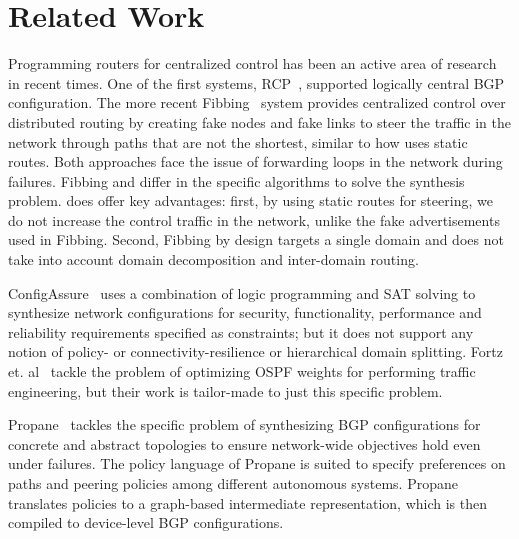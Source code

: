 \section{Related Work}\label{sec:related}
 Programming routers for centralized
control has been an active area of research in recent times. One of
the first systems, RCP~\cite{rcp}, supported logically central BGP
configuration. The more recent Fibbing~\cite{fibbing} system provides
centralized control over distributed routing by creating fake nodes
and fake links to steer the traffic in the network through paths that
are not the shortest, similar to how \name uses static routes.  Both
approaches face the issue of forwarding loops in the network during
failures. Fibbing and \name differ in the specific algorithms to solve
the synthesis problem.  \name does offer key advantages: first, by
using static routes for steering, we do not increase the control traffic in
the network, unlike the fake advertisements used in Fibbing. Second,
Fibbing by design targets a single domain and does not take into account
domain decomposition and inter-domain routing. 



ConfigAssure~\cite{configassure}
uses a combination of logic programming and SAT solving to synthesize
network configurations for security, 
functionality, performance and
reliability requirements specified as constraints; 
but it does not
support any notion of policy- or connectivity-resilience 
or hierarchical domain splitting.  Fortz
et. al~\cite{ospf-te} tackle the problem of optimizing OSPF weights
for performing traffic engineering, but their work is tailor-made
to just this specific problem.

Propane~\cite{propane, propaneat} tackles the specific problem of
synthesizing BGP configurations for concrete and abstract topologies
to ensure network-wide objectives hold even under failures. The policy
language of Propane is suited to specify preferences on paths and
peering policies among different autonomous systems. Propane
translates policies to a graph-based intermediate representation,
which is then compiled to device-level BGP configurations. 

